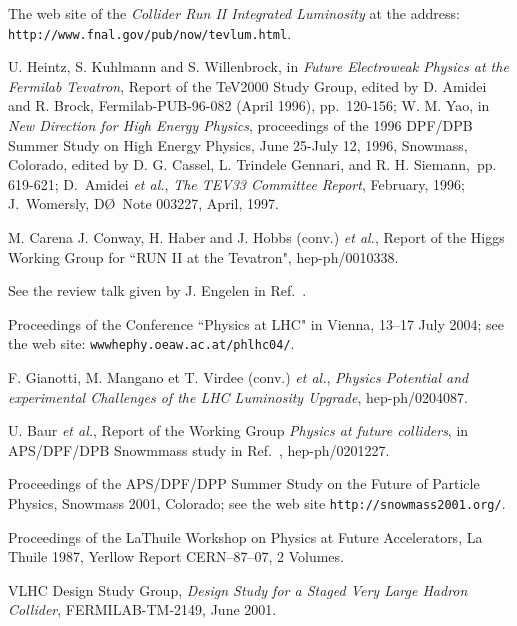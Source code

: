 \begin{thebibliography}{999}
 The web site of the {\it Collider Run II Integrated 
Luminosity} at the address:  
{\tt http://www.fnal.gov/pub/now/tevlum.html}.

U. Heintz, S. Kuhlmann and S. Willenbrock,
                       in {\it Future Electroweak Physics at the
                        Fermilab Tevatron}, Report of the TeV2000
                        Study Group, edited by D. Amidei and R. Brock,
                        Fermilab-PUB-96-082 (April 1996), pp.~120-156; 
W. M. Yao, in {\it New Direction for High
                        Energy Physics}, proceedings of the 1996
                        DPF/DPB Summer Study on High Energy Physics,
                        June 25-July 12, 1996, Snowmass, Colorado,
                        edited by D. G. Cassel, L. Trindele Gennari,
                        and R. H. Siemann,~pp. 619-621;
D.~Amidei {\it et al.}, {\it The TEV33 Committee Report}, February, 1996;
J.~Womersly, D\O\ Note 003227, April, 1997.
 
 M. Carena J. Conway, H. Haber and J. Hobbs (conv.) {\it 
et al.}, Report of the Higgs Working Group for ``RUN II at the  Tevatron",  
hep-ph/0010338.

 See the review talk given by J. Engelen in 
Ref.~\cite{Vienna}.  

 Proceedings of the Conference ``Physics at LHC" in Vienna,
13--17 July 2004; see the web site: {\tt wwwhephy.oeaw.ac.at/phlhc04/}.  

 F. Gianotti, M. Mangano et T. Virdee (conv.) {\it et al.}, 
{\it Physics Potential and experimental Challenges of the LHC Luminosity 
Upgrade}, hep-ph/0204087. 

 U. Baur {\it et al.}, Report of the Working Group {\it 
Physics at future colliders}, in APS/DPF/DPB Snowmmass study in 
Ref.~\cite{Snowmass2001}, hep-ph/0201227.  

 Proceedings of the APS/DPF/DPP Summer Study on the 
Future of Particle Physics, Snowmass 2001, Colorado; see the web site
{\tt http://snowmass2001.org/}.  

 Proceedings of the LaThuile Workshop on Physics at Future
Accelerators, La Thuile 1987, Yerllow Report CERN--87--07, 2 Volumes.   

 VLHC Design Study Group, {\it Design Study for a Staged Very 
Large Hadron Collider}, FERMILAB-TM-2149, June 2001.  


\end{thebibliography}
